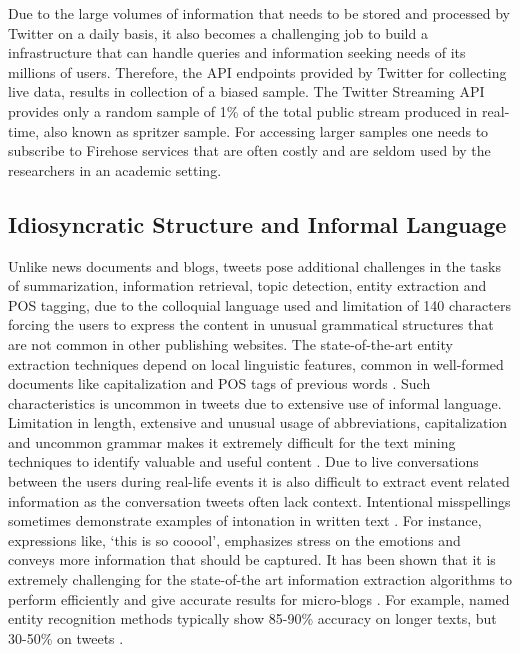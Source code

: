 Due to the large volumes of information that needs to be stored and processed by Twitter on a daily basis, it also becomes a challenging job to build a infrastructure that can handle queries and information seeking needs of its millions of users. Therefore, the API endpoints provided by Twitter for collecting live data, results in collection of a biased sample. The Twitter Streaming API provides only a random sample of 1\%  of the total public stream produced in real-time, also known as spritzer sample. For accessing larger samples one needs to subscribe to Firehose services that are often costly and are seldom used by the researchers in an academic setting.

\subsection{Idiosyncratic Structure and Informal Language}
Unlike news documents and blogs, tweets pose additional challenges in the tasks of summarization, information retrieval, topic detection, entity extraction and POS tagging, due to the colloquial language used and limitation of 140 characters forcing the users to express the content in unusual grammatical structures that are not common in other publishing websites. The state-of-the-art entity extraction techniques depend on local linguistic features, common in well-formed documents like capitalization and POS tags of previous words \cite{ratinov2009design}. Such characteristics is uncommon in tweets due to extensive use of informal language. Limitation in length, extensive and unusual usage of abbreviations, capitalization and uncommon grammar makes it extremely difficult for the text mining techniques to identify valuable and useful content \cite{bontcheva2013twitie}. Due to live conversations between the users during real-life events it is also difficult to extract event related information as the conversation tweets often lack context. Intentional misspellings sometimes demonstrate examples of intonation in written text \cite{prevost1996information}. For instance, expressions like, `this is so cooool', emphasizes stress on the emotions and conveys more information that should be captured. It has been shown that it is extremely challenging for the state-of-the art information extraction algorithms to perform efficiently and give accurate results for micro-blogs \cite{derczynski2013microblog}. For example, named entity recognition methods typically show 85-90\% accuracy on longer texts, but 30-50\% on tweets \cite{ritter2011named}.






